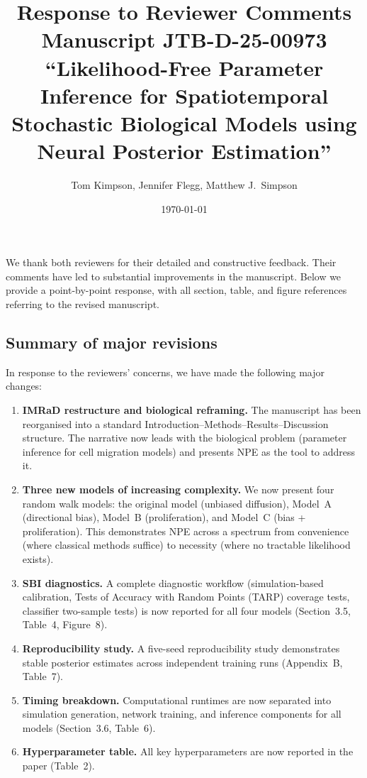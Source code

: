 \documentclass[11pt,a4paper]{article}
\title{Response to Reviewer Comments\\[0.5em]
\large Manuscript JTB-D-25-00973\\
``Likelihood-Free Parameter Inference for Spatiotemporal\\
Stochastic Biological Models using Neural Posterior Estimation''}
\author{Tom Kimpson, Jennifer Flegg, Matthew J.\ Simpson}
\date{\today}
\begin{document}
\maketitle

\noindent
We thank both reviewers for their detailed and constructive feedback. Their comments have led to substantial improvements in the manuscript. Below we provide a point-by-point response, with all section, table, and figure references referring to the revised manuscript.

\subsection*{Summary of major revisions}

In response to the reviewers' concerns, we have made the following major changes:

\begin{enumerate}[leftmargin=*]
  \item \textbf{IMRaD restructure and biological reframing.} The manuscript has been reorganised into a standard Introduction--Methods--Results--Discussion structure. The narrative now leads with the biological problem (parameter inference for cell migration models) and presents NPE as the tool to address it.
  \item \textbf{Three new models of increasing complexity.} We now present four random walk models: the original model (unbiased diffusion), Model~A (directional bias), Model~B (proliferation), and Model~C (bias + proliferation). This demonstrates NPE across a spectrum from convenience (where classical methods suffice) to necessity (where no tractable likelihood exists).
  \item \textbf{SBI diagnostics.} A complete diagnostic workflow (simulation-based calibration, Tests of Accuracy with Random Points (TARP) coverage tests, classifier two-sample tests) is now reported for all four models (Section~3.5, Table~4, Figure~8).
  \item \textbf{Reproducibility study.} A five-seed reproducibility study demonstrates stable posterior estimates across independent training runs (Appendix~B, Table~7).
  \item \textbf{Timing breakdown.} Computational runtimes are now separated into simulation generation, network training, and inference components for all models (Section~3.6, Table~6).
  \item \textbf{Hyperparameter table.} All key hyperparameters are now reported in the paper (Table~2).
\end{enumerate}
\end{document}
